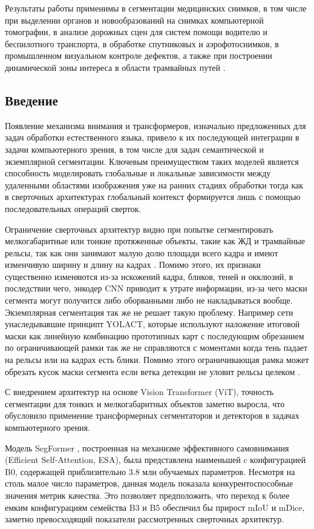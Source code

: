 \documentclass[a4paper,14pt]{article}
\numberwithin{figure}{section}
\numberwithin{table}{section}
\begin{document}
Результаты работы применимы в сегментации медицинских снимков, в том числе при выделении органов и новообразований 
на снимках компьютерной томографии, в анализе дорожных сцен для систем помощи водителю и беспилотного транспорта, в 
обработке спутниковых и аэрофотоснимков, в промышленном визуальном контроле дефектов, а также при построении 
динамической зоны интереса в области трамвайных путей \cite{myarticle}.

\subsection{Введение}
	Появление механизма внимания и трансформеров, изначально предложенных для задач обработки 
	естественного языка, привело к их последующей интеграции в задачи компьютерного зрения, в том числе для задач 
	семантической и экземплярной сегментации. Ключевым преимуществом таких моделей является способность
	моделировать глобальные и локальные зависимости между удаленными областями изображения уже
	на ранних стадиях обработки тогда как в сверточных архитектурах глобальный
	контекст формируется лишь с помощью последовательных операций сверток.

	Ограничение сверточных архитектур видно при попытке сегментировать мелкогабаритные или тонкие протяженные объекты, такие как
	ЖД и трамвайные рельсы, так как они занимают малую долю площади всего кадра и имеют изменчивую ширину и длину на кадрах \cite{myarticle}. Помимо этого, 
	их признаки существенно изменяются из-за искожений кадра, бликов, теней и окклюзий, в последствии чего, энкодер CNN приводит к утрате информации, из-за 
	чего маски сегмента могут получится либо оборванными либо не накладываться вообще. 
	Экземплярная сегментация так же не решает такую проблему. Например сети унаследывавшие принципт YOLACT, которые используют наложение итоговой маски как линейную 
	комбинацию прототипных карт с последующим обрезанием по ограничивающей рамки так же не справляются с моментами когда тень падает на рельсы или на кадрах есть блики. 
	Помимо этого ограничивающая рамка может обрезать кусок маски сегмента если ветка детекции не уловит рельсы целеком \cite{myarticle}. 

	С внедрением архитектур на основе Vision Transformer (ViT), точность сегментации для тонких и мелкогабаритных объектов заметно выросла, что обусловило 
	применение трансформерных сегментаторов и детекторов в задачах компьютерного зрения. 
	
	Модель SegFormer \cite{segformer}, построенная на механизме эффективного самовнимания
	(Efficient Self-Attention, ESA), была представлена наименьшей c конфигурацией
	B0, содержащей приблизительно 3.8 млн обучаемых параметров. Несмотря на столь
	малое число параметров, данная модель показала конкурентоспособные значения
	метрик качества. Это позволяет предположить, что переход к более емким конфигурациям семейства B3 и B5 обеспечил бы прирост mIoU и mDice, 
	заметно превосходящий показатели рассмотренных сверточных архитектур.
\end{document}
